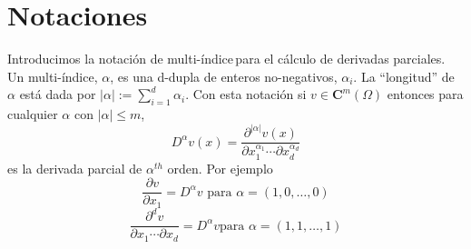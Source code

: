 \section{Notaciones}
%

Introducimos la notación de multi-índice$\,$para el cálculo de
derivadas parciales. Un multi-índice, $\alpha $, es una d-dupla de
enteros no-negativos, $\alpha _{i}$. La ``longitud'' de $\alpha $ está
dada por $\left| \alpha \right| :=\sum\limits_{i=1}^{d}\alpha _{i}.$ Con
esta notación si $v\in \mathbf{C}^{m}\left( \Omega \right) $ entonces
para cualquier $\alpha $ con $\left| \alpha \right| \leqslant m$,
\[
D^{\alpha }v\left( x\right) =\frac{\partial ^{\left| \alpha \right| }v\left(
	x\right) }{\partial x_{1}^{\alpha _{1}}\cdots\partial x_{d}^{\alpha _{d}}}
\]
es la derivada parcial de $\alpha ^{th}$ orden. Por ejemplo
\[
\frac{\partial v}{\partial x_{1}}=D^{\alpha }v\text{ para }\alpha =\left(
1,0,\ldots,0\right)
\]
\[
\frac{\partial ^{d}v}{\partial x_{1}\cdots\partial x_{d}}=D^{\alpha }v\text{
	para }\alpha =\left( 1,1,\ldots,1\right)
\]

